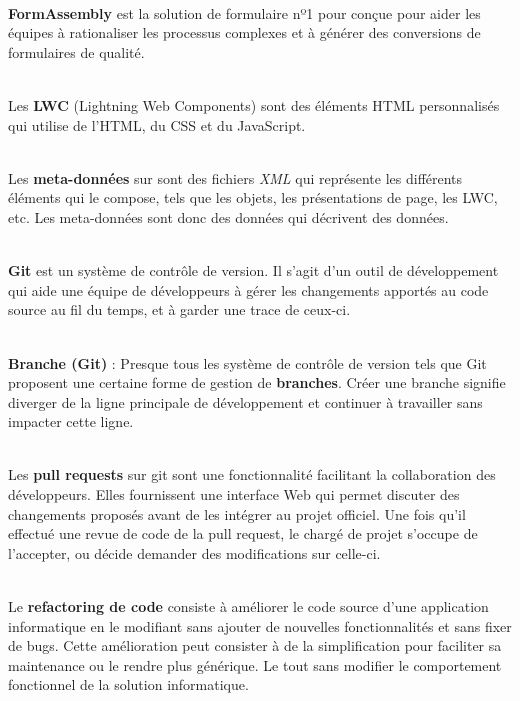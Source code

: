 \documentclass[12pt,oneside,noprintercorrection]{iut}
\begin{document}
   ~\\\indent \textbf{FormAssembly} est la solution de formulaire nº1 pour \slf{} conçue pour aider les équipes à rationaliser les processus complexes et à générer des conversions de formulaires de qualité.\newline


   ~\\\indent Les \textbf{LWC} (Lightning Web Components) sont des éléments HTML personnalisés qui utilise de l'HTML, du CSS et du JavaScript.\newline

  ~\\\indent  Les \textbf{meta-données} sur \slf{} sont des fichiers \textit{XML} qui représente les différents éléments qui le compose, tels que les objets, les présentations de page, les LWC, etc. Les meta-données sont donc des données qui décrivent des données.\newline


    ~\\\indent \textbf{Git} est un système de contrôle de version. Il s’agit d’un outil de développement qui aide une équipe de développeurs à gérer les changements apportés au code source au fil du temps, et à garder une trace de ceux-ci.\newline


 ~\\\indent \textbf{Branche (Git)} : Presque tous les système de contrôle de version tels que Git proposent une certaine forme de gestion de \textbf{branches}. Créer une branche signifie diverger de la ligne principale de développement et continuer à travailler sans impacter cette ligne.\newline


 ~\\\indent Les \textbf{pull requests} sur git sont une fonctionnalité facilitant la collaboration des développeurs. Elles fournissent une interface Web qui permet discuter des changements proposés avant de les intégrer au projet officiel. Une fois qu'il effectué une revue de code de la pull request, le chargé de projet s'occupe de l'accepter, ou décide demander des modifications sur celle-ci.
\newline

 ~\\\indent Le \textbf{refactoring de code} consiste à améliorer le code source d’une application informatique en le modifiant sans ajouter de nouvelles fonctionnalités et sans fixer de bugs. Cette amélioration peut consister à de la simplification pour faciliter sa maintenance ou le rendre plus générique. Le tout sans modifier le comportement fonctionnel de la solution informatique.\newline
\end{document}
